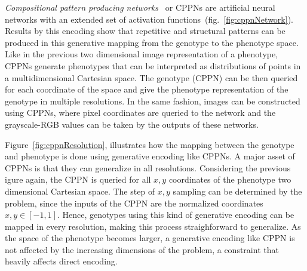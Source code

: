 \emph{Compositional pattern producing networks}~\citep{stanley2007compositional} or CPPNs are artificial neural networks with an extended set of activation functions~(fig.~\ref{fig:cppnNetwork}). Results by this encoding show that repetitive and structural patterns can be produced in this generative mapping from the genotype to the phenotype space. Like in the previous two dimensional image representation of a phenotype, CPPNs generate phenotypes that can be interpreted as distributions of points in a multidimensional Cartesian space. The genotype (CPPN) can be then queried for each coordinate of the space and give the phenotype representation of the genotype in multiple resolutions. In the same fashion, images can be constructed using CPPNs, where pixel coordinates are queried to the network and the grayscale-RGB values can be taken by the outputs of these networks. 


Figure~\ref{fig:cppnResolution}, illustrates how the mapping between the genotype and phenotype is done using generative encoding like CPPNs. A major asset of CPPNs is that they can generalize in all resolutions. Considering the previous igure again, the CPPN is queried for all $x,y$ coordinates of the phenotype two dimensional Cartesian space. The step of $x,y$ sampling can be determined by the problem, since the inputs of the CPPN are the normalized coordinates $x,y \in [-1,1]$. Hence, genotypes using this kind of generative encoding can be mapped in every resolution, making this process straighforward to generalize. As the space of the phenotype becomes larger, a generative encoding like CPPN is not affected by the increasing dimensions of the problem, a constraint that heavily affects direct encoding.

